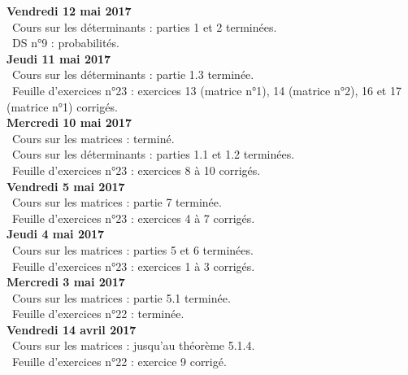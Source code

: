 \documentclass[12pt,a4paper]{article}
\begin{document}
\noindent\textbf{Vendredi 12  mai 2017}\\
\bu\ Cours sur les déterminants : parties 1 et 2 terminées.\\
\bu\ DS n°9 : probabilités.\vspace{.4cm}\\

\noindent\textbf{Jeudi 11 mai 2017}\\
\bu\ Cours sur les déterminants : partie 1.3 terminée.\\
\bu\ Feuille d'exercices n°23 : exercices 13 (matrice n°1), 14 (matrice n°2), 16 et 17 (matrice n°1) corrigés.\vspace{.4cm}\\

\noindent\textbf{Mercredi 10 mai 2017}\\
\bu\ Cours sur les matrices : terminé.\\
\bu\ Cours sur les déterminants : parties 1.1 et 1.2 terminées.\\
\bu\ Feuille d'exercices n°23 : exercices 8 à 10 corrigés.\vspace{.4cm}\\

\noindent\textbf{Vendredi 5 mai 2017}\\
\bu\ Cours sur les matrices : partie 7 terminée.\\
\bu\ Feuille d'exercices n°23 : exercices 4 à 7 corrigés.\vspace{.4cm}\\

\noindent\textbf{Jeudi 4 mai 2017}\\
\bu\ Cours sur les matrices : parties 5 et 6 terminées.\\
\bu\ Feuille d'exercices n°23 : exercices 1 à 3 corrigés.\vspace{.4cm}\\

\noindent\textbf{Mercredi 3 mai 2017}\\
\bu\ Cours sur les matrices : partie 5.1 terminée.\\
\bu\ Feuille d'exercices n°22 : terminée.\vspace{.4cm}\\

\noindent\textbf{Vendredi 14 avril 2017}\\
\bu\ Cours sur les matrices : jusqu'au théorème 5.1.4.\\
\bu\ Feuille d'exercices n°22 : exercice 9 corrigé.\vspace{.4cm}\\
\end{document}
